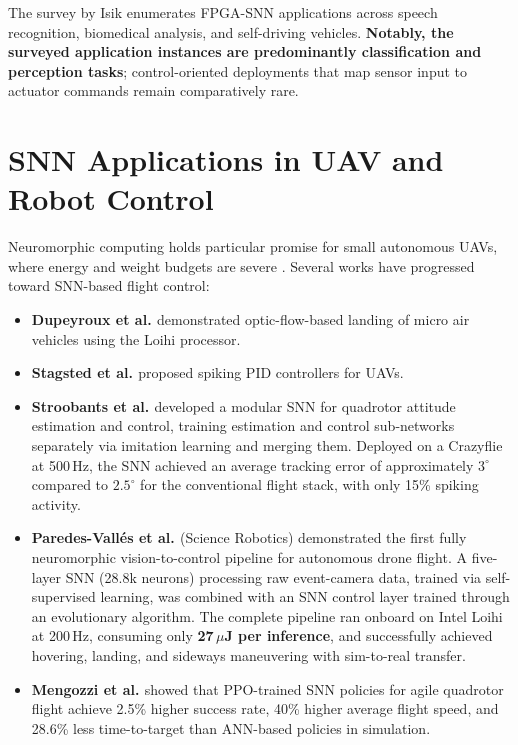 \documentclass[12pt,a4paper]{article}
\begin{document}
The survey by Isik \cite{Isik2023} enumerates FPGA-SNN applications across speech recognition, biomedical analysis, and self-driving vehicles. \textbf{Notably, the surveyed application instances are predominantly classification and perception tasks}; control-oriented deployments that map sensor input to actuator commands remain comparatively rare.

\section{SNN Applications in UAV and Robot Control}
\label{sec:drone}
Neuromorphic computing holds particular promise for small autonomous UAVs, where energy and weight budgets are severe \cite{Paredes2024}. Several works have progressed toward SNN-based flight control:
\begin{itemize}
    \item \textbf{Dupeyroux et al. \cite{Dupeyroux2021}} demonstrated optic-flow-based landing of micro air vehicles using the Loihi processor.
    \item \textbf{Stagsted et al. \cite{Stagsted2020}} proposed spiking PID controllers for UAVs.
    \item \textbf{Stroobants et al. \cite{Stroobants2025}} developed a modular SNN for quadrotor attitude estimation and control, training estimation and control sub-networks separately via imitation learning and merging them. Deployed on a Crazyflie at 500\,Hz, the SNN achieved an average tracking error of approximately $3^\circ$ compared to $2.5^\circ$ for the conventional flight stack, with only 15\% spiking activity.
    \item \textbf{Paredes-Vall\'es et al. \cite{Paredes2024}} (Science Robotics) demonstrated the first fully neuromorphic vision-to-control pipeline for autonomous drone flight. A five-layer SNN (28.8k neurons) processing raw event-camera data, trained via self-supervised learning, was combined with an SNN control layer trained through an evolutionary algorithm. The complete pipeline ran onboard on Intel Loihi at 200\,Hz, consuming only \textbf{27\,$\mu$J per inference}, and successfully achieved hovering, landing, and sideways maneuvering with sim-to-real transfer.
    \item \textbf{Mengozzi et al. \cite{Mengozzi2025}} showed that PPO-trained SNN policies for agile quadrotor flight achieve 2.5\% higher success rate, 40\% higher average flight speed, and 28.6\% less time-to-target than ANN-based policies in simulation.
\end{itemize}
\end{document}

